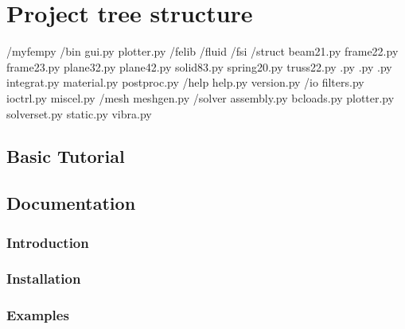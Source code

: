 \documentclass[letterpaper,10pt,english]{sphinxmanual}
\begin{document}
\chapter{Project tree structure}
\label{\detokenize{index:project-tree-structure}}
\begin{sphinxVerbatim}[commandchars=\\\{\}]
/myfempy
\PYGZhy{}\PYGZhy{}/bin
   gui.py
   plotter.py
\PYGZhy{}\PYGZhy{}/felib
   \PYGZhy{}\PYGZhy{}/fluid
   
   
   
   \PYGZhy{}\PYGZhy{}/fsi
   
   
   
   \PYGZhy{}\PYGZhy{}/struct
       beam21.py
       frame22.py
       frame23.py
       plane32.py
       plane42.py
       solid83.py
       spring20.py
       truss22.py
       .py
       .py
       .py
   integrat.py
   material.py
   postproc.py
\PYGZhy{}\PYGZhy{}/help
   help.py
   version.py
\PYGZhy{}\PYGZhy{}/io
   filters.py
   ioctrl.py
   miscel.py
\PYGZhy{}\PYGZhy{}/mesh
   meshgen.py
\PYGZhy{}\PYGZhy{}/solver
       assembly.py
       bcloads.py
       plotter.py
       solverset.py
       static.py
       vibra.py
\end{sphinxVerbatim}

\sphinxstepscope


\section{Basic Tutorial}
\label{\detokenize{tutorial:basic-tutorial}}\label{\detokenize{tutorial::doc}}
\sphinxstepscope


\section{Documentation}
\label{\detokenize{documentation:documentation}}\label{\detokenize{documentation::doc}}
\sphinxstepscope


\subsection{Introduction}
\label{\detokenize{introduction:introduction}}\label{\detokenize{introduction::doc}}
\sphinxstepscope


\subsection{Installation}
\label{\detokenize{installation:installation}}\label{\detokenize{installation::doc}}
\sphinxstepscope


\subsection{Examples}
\label{\detokenize{examples:examples}}\label{\detokenize{examples::doc}}


\renewcommand{\indexname}{Index}
\printindex
\end{document}
